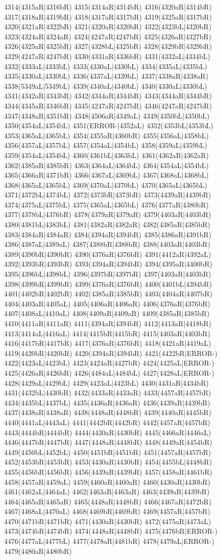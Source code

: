 4314(4315aR|4316bR) 4315(4314aR|4314bR) 4316(4320aR|4314bR) 4317(4318aR|4319bR) 4318(4317aR|4317bR) 4319(4325aR|4317bR) 4320(4321aR|4322bR) 4321(4320aR|4320bR) 4322(4323bL|4320bR) 4323(4324aR|4324aR) 4324(4247aR|4247bR) 4325(4326aR|4327bR) 4326(4325aR|4325bR) 4327(4328bL|4325bR) 4328(4329bR|4329bR) 4329(4247aR|4247bR) 4330(4331aR|4336bR) 4331(4332aL|4334bL) 4332(4333aL|4333bL) 4333(4330aL|4330bL) 4334(4335aL|4335bL) 4335(4330aL|4330bL) 4336(4337aL|4339bL) 4337(4338aR|4338aR) 4338(5349aL|5349bL) 4339(4340aL|4340bL) 4340(4330aL|4330bL) 4341(4342aR|4343bR) 4342(4344aR|4344bR) 4343(4344aR|4344bR) 4344(4345aR|4346bR) 4345(4247aR|4247bR) 4346(4247aR|4247bR) 4347(4348aR|4351bR) 4348(4506aR|4349aL) 4349(4350bL|4350bL) 4350(4354aL|4354bL) 4351(ERROR-|4352aL) 4352(4353bL|4353bL) 4353(4365aL|4365bL) 4354(4355aR|4360bR) 4355(4356aL|4358bL) 4356(4357aL|4357bL) 4357(4354aL|4354bL) 4358(4359aL|4359bL) 4359(4354aL|4354bL) 4360(4361bL|4363bL) 4361(4362aR|4362aR) 4362(4385aR|4385bR) 4363(4364aL|4364bL) 4364(4354aL|4354bL) 4365(4366aR|4371bR) 4366(4367aL|4369bL) 4367(4368aL|4368bL) 4368(4365aL|4365bL) 4369(4370aL|4370bL) 4370(4365aL|4365bL) 4371(4372bL|4374bL) 4372(4373bR|4373bR) 4373(4439aR|4439bR) 4374(4375aL|4375bL) 4375(4365aL|4365bL) 4376(4377aR|4380bR) 4377(4378bL|4376bR) 4378(4379aR|4379aR) 4379(4403aR|4403bR) 4380(4381bL|4383bL) 4381(4382aR|4382aR) 4382(4385aR|4385bR) 4383(4384aR|4384aR) 4384(4394aR|4394bR) 4385(4386aR|4391bR) 4386(4387aL|4389aL) 4387(4388bR|4388bR) 4388(4403aR|4403bR) 4389(4390bR|4390bR) 4390(4376aR|4376bR) 4391(4412aR|4392aL) 4392(4393bR|4393bR) 4393(4394aR|4394bR) 4394(4395aR|4400bR) 4395(4396bL|4398bL) 4396(4397bR|4397bR) 4397(4403aR|4403bR) 4398(4399bR|4399bR) 4399(4376aR|4376bR) 4400(4401bL|4394bR) 4401(4402bR|4402bR) 4402(4385aR|4385bR) 4403(4404aR|4407bR) 4404(4403aR|4405aL) 4405(4406aR|4406aR) 4406(4376aR|4376bR) 4407(4408aL|4410aL) 4408(4409aR|4409aR) 4409(4385aR|4385bR) 4410(4411aR|4411aR) 4411(4394aR|4394bR) 4412(4413aR|4418bR) 4413(4414aL|4416aL) 4414(4415bR|4415bR) 4415(4403aR|4403bR) 4416(4417bR|4417bR) 4417(4376aR|4376bR) 4418(4421aR|4419aL) 4419(4420bR|4420bR) 4420(4394aR|4394bR) 4421(4422bR|ERROR-) 4422(4423aL|4423bL) 4423(4424aR|4427bR) 4424(4425aL|ERROR-) 4425(4426aR|4426bR) 4426(4484aL|4484bL) 4427(4428aL|ERROR-) 4428(4429aL|4429bL) 4429(4423aL|4423bL) 4430(4431aR|4434bR) 4431(4432bL|4430bR) 4432(4433aR|4433aR) 4433(4457aR|4457bR) 4434(4435bL|4437bL) 4435(4436aR|4436aR) 4436(4439aR|4439bR) 4437(4438aR|4438aR) 4438(4448aR|4448bR) 4439(4440aR|4445bR) 4440(4441aL|4443aL) 4441(4442bR|4442bR) 4442(4457aR|4457bR) 4443(4444bR|4444bR) 4444(4430aR|4430bR) 4445(4466aR|4446aL) 4446(4447bR|4447bR) 4447(4448aR|4448bR) 4448(4449aR|4454bR) 4449(4450bL|4452bL) 4450(4451bR|4451bR) 4451(4457aR|4457bR) 4452(4453bR|4453bR) 4453(4430aR|4430bR) 4454(4455bL|4448bR) 4455(4456bR|4456bR) 4456(4439aR|4439bR) 4457(4458aR|4461bR) 4458(4457aR|4459aL) 4459(4460aR|4460aR) 4460(4430aR|4430bR) 4461(4462aL|4464aL) 4462(4463aR|4463aR) 4463(4439aR|4439bR) 4464(4465aR|4465aR) 4465(4448aR|4448bR) 4466(4467aR|4472bR) 4467(4468aL|4470aL) 4468(4469bR|4469bR) 4469(4457aR|4457bR) 4470(4471bR|4471bR) 4471(4430aR|4430bR) 4472(4475aR|4473aL) 4473(4474bR|4474bR) 4474(4448aR|4448bR) 4475(4476bR|ERROR-) 4476(4477aL|4477bL) 4477(4478aR|4481bR) 4478(4479aL|ERROR-) 4479(4480aR|4480bR) 
